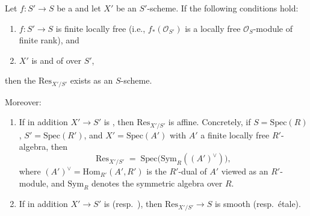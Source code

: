 \begin{theorem} \label{theorem:existence_of_weil_restriction}
    Let $f : S' \to S$ be a  and let $X'$ be an $S'$-scheme. If the following conditions hold:
    \begin{enumerate}
        \item $f : S' \to S$ is finite locally free (i.e., $f_*(\mathcal{O}_{S'})$ is a locally free $\mathcal{O}_S$-module of finite rank), and
        \item $X'$ is  and of  over $S'$,
    \end{enumerate}
    then the  $\mathrm{Res}_{X'/S'}$ exists as an $S$-scheme.

    Moreover:
    \begin{enumerate}[resume]
        \item If in addition $X' \to S'$ is , then $\mathrm{Res}_{X'/S'}$ is affine. Concretely, if $S = \mathrm{Spec}(R)$, $S' = \mathrm{Spec}(R')$, and $X' = \mathrm{Spec}(A')$ with $A'$ a finite locally free $R'$-algebra, then
        $$\mathrm{Res}_{X'/S'} \;=\; \mathrm{Spec}\bigl(\mathrm{Sym}_{R}((A')^\vee)\bigr),$$
        where $(A')^\vee = \mathrm{Hom}_{R'}(A', R')$ is the $R'$-dual of $A'$ viewed as an $R'$-module, and $\mathrm{Sym}_{R}$ denotes the symmetric algebra over $R$.

        \item If in addition $X' \to S'$ is  (resp.\ ), then $\mathrm{Res}_{X'/S'} \to S$ is smooth (resp.\ étale).
    \end{enumerate}
\end{theorem}
